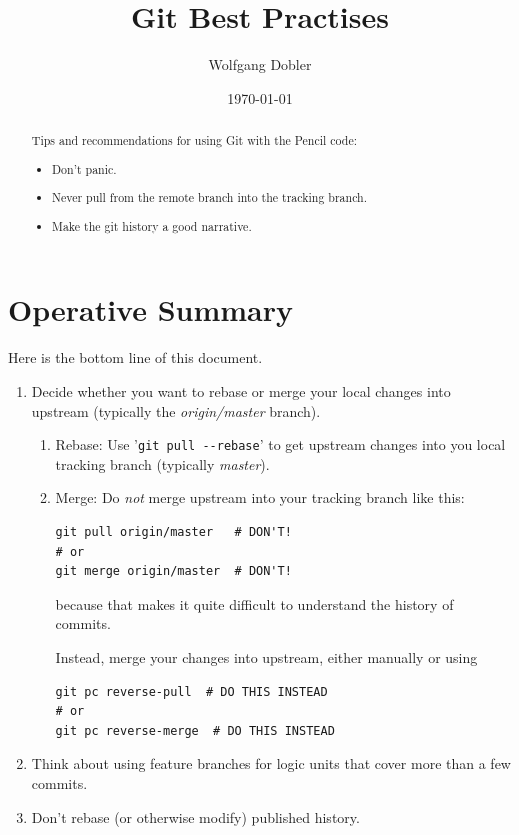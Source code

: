 \documentclass[12pt,pdftex]{article}
\author{Wolfgang Dobler}
\date{\today}
\title{Git Best Practises}
\begin{document}
\maketitle
\tableofcontents

\thispagestyle{empty}

\begin{abstract}
\noindent%
Tips and recommendations for using Git with the Pencil code:
\begin{itemize}
\item Don't panic.
\item Never pull from the remote branch into the tracking branch.
\item Make the git history a good narrative.
\end{itemize}
\end{abstract}


\section{Operative Summary}
\label{sec-1}

Here is the bottom line of this document.

\begin{enumerate}
\item Decide whether you want to rebase or merge your local changes into
upstream (typically the \emph{origin/master} branch).

\begin{enumerate}
\item Rebase: Use '\texttt{git pull -{}-rebase}' to get upstream changes into you
local tracking branch (typically \emph{master}).

\item Merge: Do \emph{not} merge upstream into your tracking branch like this:
\lstset{frame=single,basicstyle=\ttfamily\footnotesize,language=sh,label= ,caption= ,captionpos=b,numbers=none}
\begin{lstlisting}
git pull origin/master   # DON'T!
# or
git merge origin/master  # DON'T!
\end{lstlisting}
because that
makes it quite difficult to
understand the history of commits.

Instead, merge your changes into upstream, either manually or
using
\lstset{frame=single,basicstyle=\ttfamily\footnotesize,language=sh,label= ,caption= ,captionpos=b,numbers=none}
\begin{lstlisting}
git pc reverse-pull  # DO THIS INSTEAD
# or
git pc reverse-merge  # DO THIS INSTEAD
\end{lstlisting}
\end{enumerate}

\item Think about using feature branches for logic units that cover more
than a few commits.

\item Don't rebase (or otherwise modify) published history.
\end{enumerate}
\end{document}
